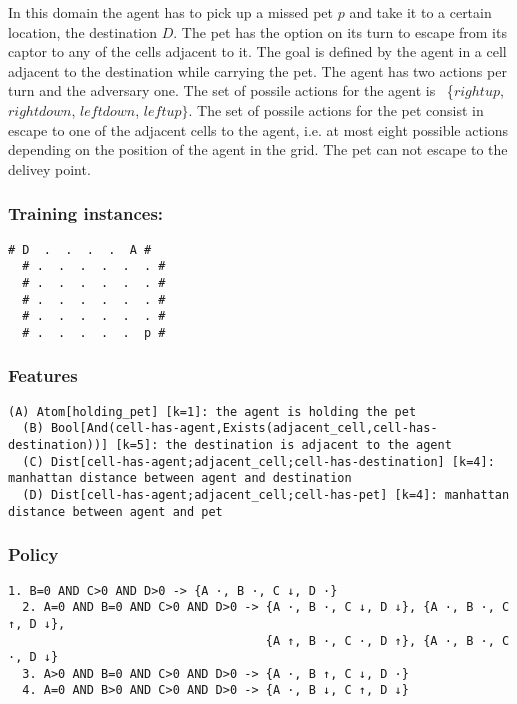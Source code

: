 \documentclass[a4paper]{article}
\begin{document}
In this domain the agent has to pick up a missed pet $p$ and take it to a certain location, the destination $D$. The pet has the option on its turn to escape from its captor to any of the cells adjacent to it. The goal is defined by the agent in a cell adjacent to the destination while carrying the pet. The agent has two actions per turn and the adversary one. The set of possile actions for the agent is ~\{$rightup$, $rightdown$, $leftdown$, $leftup\}$.  The set of possile actions for the pet consist in escape to one of the adjacent cells to the agent, i.e. at most eight possible actions depending on the position of the agent in the grid. The pet can not escape to the delivey point.

\subsubsection{Training instances:}
\begin{Verbatim}[fontsize=\footnotesize]
  # D  .  .  .  .  A #
  # .  .  .  .  .  . #
  # .  .  .  .  .  . #
  # .  .  .  .  .  . #
  # .  .  .  .  .  . #
  # .  .  .  .  .  p #
\end{Verbatim}

\subsubsection{Features}
\begin{Verbatim}[fontsize=\footnotesize]
  (A) Atom[holding_pet] [k=1]: the agent is holding the pet
  (B) Bool[And(cell-has-agent,Exists(adjacent_cell,cell-has-destination))] [k=5]: the destination is adjacent to the agent
  (C) Dist[cell-has-agent;adjacent_cell;cell-has-destination] [k=4]: manhattan distance between agent and destination
  (D) Dist[cell-has-agent;adjacent_cell;cell-has-pet] [k=4]: manhattan distance between agent and pet
\end{Verbatim}

\subsubsection{Policy}
\begin{Verbatim}[fontsize=\footnotesize]
  1. B=0 AND C>0 AND D>0 -> {A ·, B ·, C ↓, D ·}
  2. A=0 AND B=0 AND C>0 AND D>0 -> {A ·, B ·, C ↓, D ↓}, {A ·, B ·, C ↑, D ↓},
                                    {A ↑, B ·, C ·, D ↑}, {A ·, B ·, C ·, D ↓}
  3. A>0 AND B=0 AND C>0 AND D>0 -> {A ·, B ↑, C ↓, D ·}
  4. A=0 AND B>0 AND C>0 AND D>0 -> {A ·, B ↓, C ↑, D ↓}

\end{Verbatim}
\end{document}
